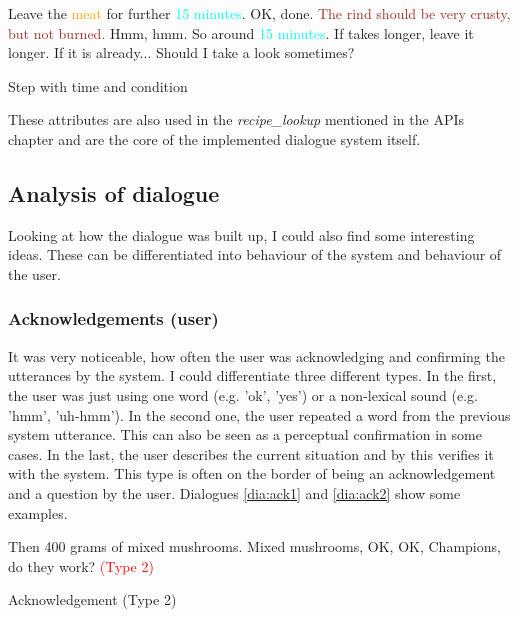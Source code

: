 \documentclass[
	11pt, %
]{fphw}
\newenvironment{captionedDialogue}
    {\captionsetup{
        type=Dialogue,
        skip=2pt,
        belowskip=15pt
        }
    }
    {}
\newenvironment{mydialogue}
    {\begin{snugshade}
     \hrulefill
     \begin{dialogue}}
    {\end{dialogue}
     \hrulefill
     \end{snugshade}}
\begin{document}
\begin{captionedDialogue}
    \begin{mydialogue}
         Leave the \textcolor{orange}{meat} for further \textcolor{cyan}{15 minutes}. 
         OK, done.
         \textcolor{brown}{The rind should be very crusty, but not burned.}
         Hmm, hmm.
         So around \textcolor{cyan}{15 minutes}. If takes longer, leave it longer. If it is already...
         Should I take a look sometimes? 
    \end{mydialogue}
    \caption{Step with time and condition}
\label{dia:step}
\end{captionedDialogue}

These attributes are also used in the \emph{recipe\_lookup} mentioned in the APIs chapter and are the core of the implemented dialogue system itself.

\subsection*{Analysis of dialogue}
Looking at how the dialogue was built up, I could also find some interesting ideas. These can be differentiated into behaviour of the system and behaviour of the user.

\subsubsection*{Acknowledgements (user)}
It was very noticeable, how often the user was acknowledging and confirming the utterances by the system. I could differentiate three different types. In the first, the user was just using one word (e.g. 'ok', 'yes') or a non-lexical sound (e.g. 'hmm', 'uh-hmm'). In the second one, the user repeated a word from the previous system utterance. This can also be seen as a perceptual confirmation in some cases. In the last, the user describes the current situation and by this verifies it with the system. This type is often on the border of being an acknowledgement and a question by the user. Dialogues \ref{dia:ack1} and \ref{dia:ack2} show some examples.

\begin{captionedDialogue}
    \begin{mydialogue}
         Then 400 grams of mixed mushrooms. 
         Mixed mushrooms, OK, OK, Champions, do they work? \textcolor{red}{(Type 2)}
    \end{mydialogue}
    \caption{Acknowledgement (Type 2)}
    \label{dia:ack1}
\end{captionedDialogue}
\end{document}
